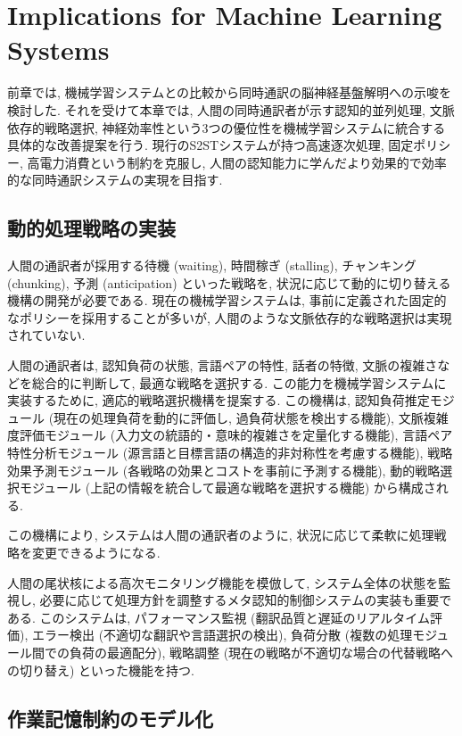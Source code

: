 \section{Implications for Machine Learning Systems}

前章では, 機械学習システムとの比較から同時通訳の脳神経基盤解明への示唆を検討した.
それを受けて本章では, 人間の同時通訳者が示す認知的並列処理, 文脈依存的戦略選択, 神経効率性という3つの優位性を機械学習システムに統合する具体的な改善提案を行う.
現行のS2STシステムが持つ高速逐次処理, 固定ポリシー, 高電力消費という制約を克服し, 人間の認知能力に学んだより効果的で効率的な同時通訳システムの実現を目指す.

\subsection{動的処理戦略の実装}

人間の通訳者が採用する待機 (waiting), 時間稼ぎ (stalling), チャンキング (chunking), 予測 (anticipation) といった戦略を, 状況に応じて動的に切り替える機構の開発が必要である.
現在の機械学習システムは, 事前に定義された固定的なポリシーを採用することが多いが, 人間のような文脈依存的な戦略選択は実現されていない.

人間の通訳者は, 認知負荷の状態, 言語ペアの特性, 話者の特徴, 文脈の複雑さなどを総合的に判断して, 最適な戦略を選択する.
この能力を機械学習システムに実装するために, 適応的戦略選択機構を提案する.
この機構は, 認知負荷推定モジュール (現在の処理負荷を動的に評価し, 過負荷状態を検出する機能), 文脈複雑度評価モジュール (入力文の統語的・意味的複雑さを定量化する機能), 言語ペア特性分析モジュール (源言語と目標言語の構造的非対称性を考慮する機能), 戦略効果予測モジュール (各戦略の効果とコストを事前に予測する機能), 動的戦略選択モジュール (上記の情報を統合して最適な戦略を選択する機能) から構成される.

この機構により, システムは人間の通訳者のように, 状況に応じて柔軟に処理戦略を変更できるようになる.

人間の尾状核による高次モニタリング機能を模倣して, システム全体の状態を監視し, 必要に応じて処理方針を調整するメタ認知的制御システムの実装も重要である.
このシステムは, パフォーマンス監視 (翻訳品質と遅延のリアルタイム評価), エラー検出 (不適切な翻訳や言語選択の検出), 負荷分散 (複数の処理モジュール間での負荷の最適配分), 戦略調整 (現在の戦略が不適切な場合の代替戦略への切り替え) といった機能を持つ.

\subsection{作業記憶制約のモデル化}

